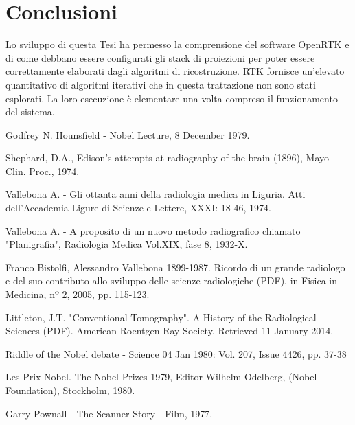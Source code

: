 \documentclass[a4paper,12pt, doubleside]{report}
\begin{document}
        \section{Conclusioni}
            \par
                Lo sviluppo di questa Tesi ha permesso la comprensione del software OpenRTK e di come debbano essere configurati gli stack di proiezioni per poter essere correttamente elaborati dagli algoritmi di ricostruzione. RTK fornisce un'elevato quantitativo di algoritmi iterativi che in questa trattazione non sono stati esplorati. La loro esecuzione è elementare una volta compreso il funzionamento del sistema.


\newpage
\begin{thebibliography}{1}
    
        Godfrey N. Hounsfield - Nobel Lecture, 8 December 1979.
    
        Shephard, D.A., Edison's attempts at radiography of the brain (1896), Mayo Clin. Proc., 1974.
    
        Vallebona A. - Gli ottanta anni della radiologia medica in Liguria. Atti dell’Accademia Ligure di Scienze e Lettere, XXXI: 18-46, 1974.
      
        Vallebona A. - A proposito di un nuovo metodo radiografico chiamato "Planigrafia", Radiologia Medica Vol.XIX, fase 8, 1932-X.
    
        Franco Bistolfi, Alessandro Vallebona 1899-1987. Ricordo di un grande radiologo e del suo contributo allo sviluppo delle scienze radiologiche (PDF), in Fisica in Medicina, nº 2, 2005, pp. 115-123.  
    
        Littleton, J.T. "Conventional Tomography". A History of the Radiological Sciences (PDF). American Roentgen Ray Society. Retrieved 11 January 2014.
    
        Riddle of the Nobel debate - Science 04 Jan 1980: Vol. 207, Issue 4426, pp. 37-38
    
        Les Prix Nobel. The Nobel Prizes 1979, Editor Wilhelm Odelberg, (Nobel Foundation), Stockholm, 1980. 
    
        Garry Pownall - The Scanner Story - Film, 1977.
    

\end{thebibliography}
\end{document}
